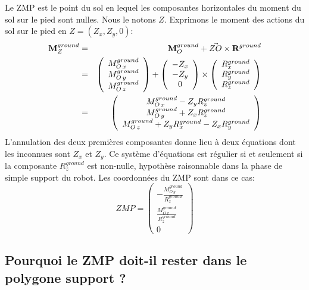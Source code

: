 Le ZMP est le point du sol en lequel les composantes horizontales du
moment du sol sur le pied sont nulles. Nous le notons $Z$. Exprimons
le moment des actions du sol sur le pied en $Z=(Z_x,Z_y,0)$:
\begin{eqnarray*}
\textbf{M}_Z^{ground} &=& \textbf{M}_O^{ground} + \vec{ZO}\times
\textbf{R}^{ground} \\
&=& \left(\begin{array}{c} M^{ground}_{O\,x} \\ M^{ground}_{O\,y} \\ M^{ground}_{O\,z}
\end{array}\right)
+
\left(\begin{array}{c} -Z_x \\ -Z_y \\ 0
\end{array}\right)
\times
\left(\begin{array}{c} R^{ground}_x \\ R^{ground}_y \\ R^{ground}_z
\end{array}\right) \\
&=&
\left(\begin{array}{c}
M^{ground}_{O\,x} - Z_y R^{ground}_z\\
M^{ground}_{O\,y} + Z_x R^{ground}_z \\
M^{ground}_{O\,z} + Z_y R^{ground}_x - Z_x R^{ground}_y
\end{array}\right)
\end{eqnarray*}
L'annulation des deux premières composantes donne lieu à deux
équations dont les inconnues sont $Z_x$ et $Z_y$. Ce système
d'équations est régulier si et seulement si la composante $R^{ground}_z$
est non-nulle, hypothèse raisonnable dans la phase de simple support
du robot. Les coordonnées du ZMP sont dans ce cas:
$$
ZMP =
\left(\begin{array}{c}
-\frac{M^{ground}_{O\,y}}{R^{ground}_z} \\
\frac{M^{ground}_{O\,x}}{R^{ground}_z} \\
0
\end{array}\right)
$$
\subsection{Pourquoi le ZMP doit-il rester dans le polygone support ?}

